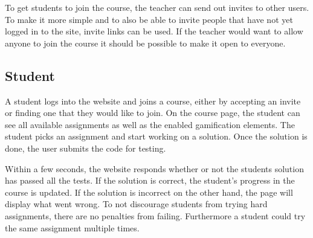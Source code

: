 To get students to join the course, the teacher can send out invites to other users. To make it more simple and to also be able to invite people that have not yet logged in to the site, invite links can be used. If the teacher would want to allow anyone to join the course it should be possible to make it open to everyone.


\subsection{Student}
A student logs into the website and joins a course, either by accepting an invite or finding one that they would like to join. On the course page, the student can see all available assignments as well as the enabled gamification elements. The student picks an assignment and start working on a solution. Once the solution is done, the user submits the code for testing.

Within a few seconds, the website responds whether or not the students solution has passed all the tests. If the solution is correct, the student's progress in the course is updated. If the solution is incorrect on the other hand, the page will display what went wrong. To not discourage students from trying hard assignments, there are no penalties from failing. Furthermore a student could try the same assignment multiple times.
